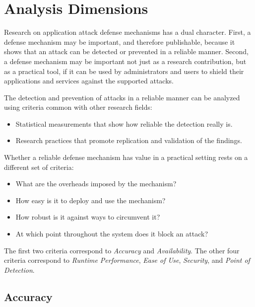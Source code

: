\documentclass[conference]{IEEEtran}
\begin{document}
\section{Analysis Dimensions}
\label{sec:dimensions}

Research on application attack defense mechanisms has a dual
character. First, a defense mechanism may be important, and therefore
publishable, because it shows that an attack can be detected or prevented in a
reliable manner. Second, a defense mechanism may be important not
just as a research contribution, but as a practical tool, if it can be
used by administrators and users to shield their applications
and services against the supported attacks.

The detection and prevention of attacks
in a reliable manner can be analyzed using
criteria common with other research fields:
\begin{itemize}
\item Statistical measurements that show how reliable the detection really
  is.
\item Research practices that promote replication and validation
of the findings.
\end{itemize}

Whether a reliable defense mechanism has value in a practical
setting rests on a different set of criteria:
\begin{itemize}
\item What are the overheads imposed by the mechanism?
\item How easy is it to deploy and use the mechanism?
\item How robust is it against ways to circumvent it?
\item At which point throughout the system does it block an attack?
\end{itemize}

The first two criteria correspond to \emph{Accuracy} and
\emph{Availability}. The other four criteria correspond to \emph{Runtime
  Performance}, \emph{Ease of Use}, \emph{Security}, and
\emph{Point of Detection}.

\subsection{Accuracy}
\label{ssec:diagnostic-performance}
\end{document}
